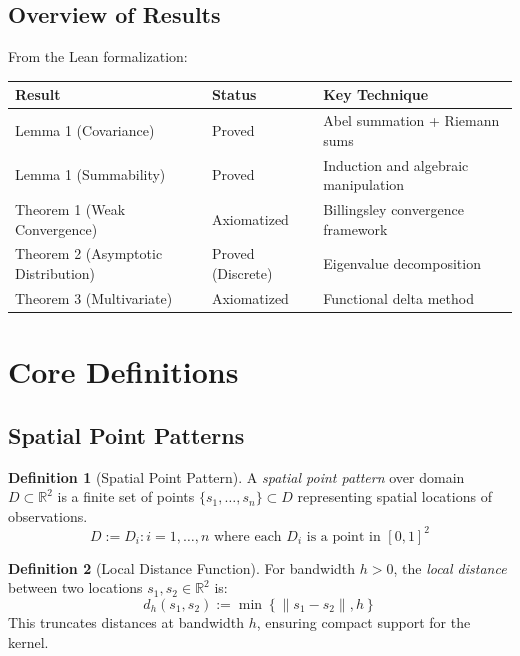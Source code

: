 \documentclass[11pt,a4paper]{amsart}
\theoremstyle{definition}
\newtheorem{definition}{Definition}[section]
\newcommand{\R}{\mathbb{R}}
\begin{document}
\subsection{Overview of Results}

From the Lean formalization:\
\begin{center}
\begin{tabular}{lll}
\toprule
\textbf{Result} & \textbf{Status} & \textbf{Key Technique} \\
\midrule
Lemma 1 (Covariance) & \textcolor{leangreen}{Proved} & Abel summation + Riemann sums \\
Lemma 1 (Summability) & \textcolor{leangreen}{Proved} & Induction and algebraic manipulation \\
Theorem 1 (Weak Convergence) & Axiomatized & Billingsley convergence framework \\
Theorem 2 (Asymptotic Distribution) & \textcolor{leangreen}{Proved (Discrete)} & Eigenvalue decomposition \\
Theorem 3 (Multivariate) & Axiomatized & Functional delta method \\
\bottomrule
\end{tabular}
\end{center}

\section{Core Definitions}
\label{sec:definitions}

\subsection{Spatial Point Patterns}
\label{subsec:point-patterns}

\begin{definition}[Spatial Point Pattern]
A \emph{spatial point pattern} over domain $D \subset \R^2$ is a finite set of points 
$\{s_1, \dots, s_n\} \subset D$ representing spatial locations of observations.
\begin{equation*}
D := {D_i : i = 1, \dots, n} \text{ where each } D_i \text{ is a point in } [0,1]^2
\end{equation*}
\end{definition}

\begin{definition}[Local Distance Function]
For bandwidth $h > 0$, the \emph{local distance} between two locations $s_1, s_2 \in \R^2$ is:
\begin{equation*}
d_h(s_1, s_2) := \min\left\{\|s_1 - s_2\|, h\right\}
\end{equation*}
This truncates distances at bandwidth $h$, ensuring compact support for the kernel.
\end{definition}
\end{document}

